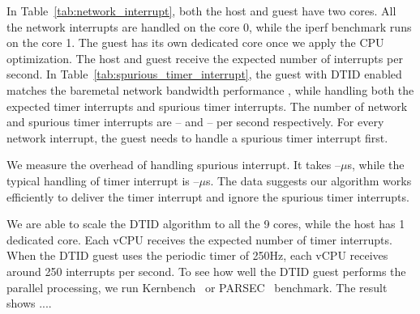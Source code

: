 In Table~\ref{tab:network_interrupt}, both the host and guest
have two cores. All the network interrupts are handled on the
core 0, while the iperf benchmark runs on the core 1. The
guest has its own dedicated core once we apply the CPU
optimization. The host and guest receive the expected number
of interrupts per second. In
Table~\ref{tab:spurious_timer_interrupt}, the guest with DTID
enabled matches the baremetal network bandwidth performance ,
while handling both the expected timer interrupts and spurious
timer interrupts. The number of network and spurious timer
interrupts are -- and -- per second respectively. For every
network interrupt, the guest needs to handle a spurious timer
interrupt first.

We measure the overhead of handling spurious interrupt. It
takes --$\mu$s, while the typical handling of timer interrupt
is --$\mu$s. The data suggests our algorithm works efficiently
to deliver the timer interrupt and ignore the spurious timer
interrupts.

We are able to scale the DTID algorithm to all the 9 cores,
while the host has 1 dedicated core. Each vCPU receives the
expected number of timer interrupts. When the DTID guest uses
the periodic timer of 250Hz, each vCPU receives around 250
interrupts per second. To see how well the DTID guest performs
the parallel processing, we run Kernbench~\cite{kernbench} or
PARSEC~\cite{bienia:2008} benchmark. The result shows ....
